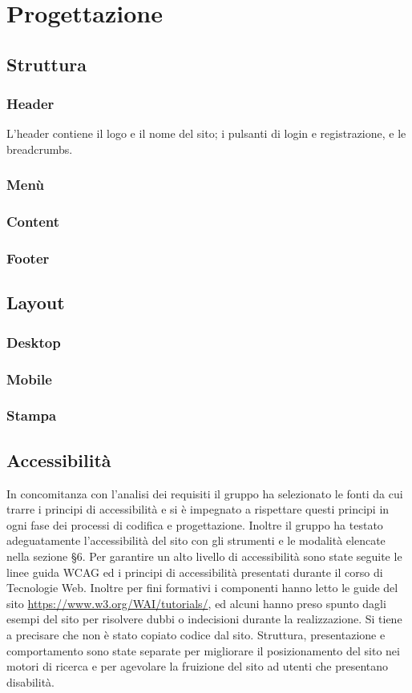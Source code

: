 \documentclass[12pt,a4paper,headings=optiontohead]{article}
\begin{document}
	
	
	\section{Progettazione}
	\subsection{Struttura}
	\subsubsection{Header}
	
	L'header contiene il logo e il nome del sito; i pulsanti di login e registrazione, e le breadcrumbs. 
	
	
	\subsubsection{Menù}
	\subsubsection{Content}
	\subsubsection{Footer}
	
	\subsection{Layout}
	\subsubsection{Desktop}
	\subsubsection{Mobile}
	\subsubsection{Stampa}

\subsection{Accessibilità}
In concomitanza con l'analisi dei requisiti il gruppo ha selezionato le fonti da cui trarre i principi di accessibilità e si è impegnato a rispettare questi principi in ogni fase dei processi di codifica e progettazione.
Inoltre il gruppo ha testato adeguatamente l'accessibilità del sito con gli strumenti e le modalità elencate nella sezione §6.
Per garantire un alto livello di accessibilità sono state seguite le linee guida WCAG ed i principi di accessibilità presentati durante il corso di Tecnologie Web. Inoltre per fini formativi i componenti hanno letto le guide del sito \url{https://www.w3.org/WAI/tutorials/}, ed alcuni hanno preso spunto dagli esempi del sito per risolvere dubbi o indecisioni durante la realizzazione. Si tiene a precisare che non è stato copiato codice dal sito.
Struttura, presentazione e comportamento sono state separate per migliorare il posizionamento del sito nei motori di ricerca e per agevolare la fruizione del sito ad utenti che presentano disabilità.
\end{document}
